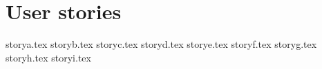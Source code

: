 \section{User stories}\label{appendix:userstories}
{storya.tex}
{storyb.tex}
{storyc.tex}
{storyd.tex}
{storye.tex}
{storyf.tex}
{storyg.tex}
{storyh.tex}
{storyi.tex}
